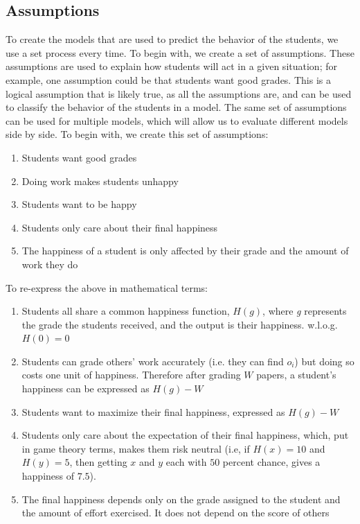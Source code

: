 \documentclass[12pt, Arial]{article}
\begin{document}
\subsection{Assumptions}
To create the models that are used to predict the behavior of the students, we use a set process every time. To begin with, we create a set of assumptions. These assumptions are used to explain how students will act in a given situation; for example, one assumption could be that students want good grades. This is a logical assumption that is likely true, as all the assumptions are, and can be used to classify the behavior of the students in a model. The same set of assumptions can be used for multiple models, which will allow us to evaluate different models side by side. To begin with, we create this set of assumptions:
\begin{enumerate}[itemsep=0pt, parsep=0pt]
	\item Students want good grades
	\item Doing work makes students unhappy
	\item Students want to be happy
	\item Students only care about their final happiness
	\item The happiness of a student is only affected by their grade and the amount of work they do
\end{enumerate}
To re-express the above in mathematical terms:
\begin{enumerate}[itemsep=0pt, parsep=0pt]
	\item Students all share a common happiness function, $H(g)$, where \emph{g} represents the grade the students received, and the output is their happiness. w.l.o.g. $H(0)=0$
	\item Students can grade others' work accurately (i.e. they can find $o_i$) but doing so costs one unit of happiness. Therefore after grading $W$ papers, a student's happiness can be expressed as $H(g)-W$
	\item Students want to maximize their final happiness, expressed as $H(g)-W$
	\item Students only care about the expectation of their final happiness, which, put in game theory terms, makes them risk neutral (i.e, if $H(x)=10$ and $H(y)=5$, then getting $x$ and $y$ each with $50$ percent chance, gives a happiness of $7.5$).
	\item The final happiness depends only on the grade assigned to the student and the amount of effort exercised. It does not depend on the score of others
\end{enumerate}
\end{document}
